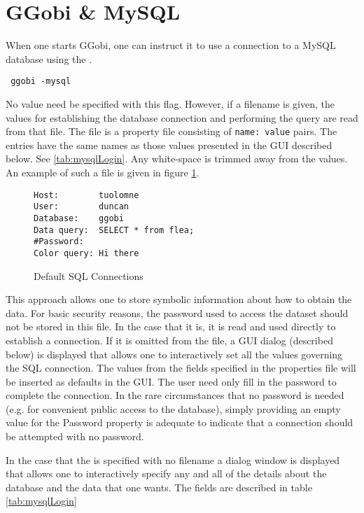 \documentclass{article}
\begin{document}
\section{GGobi \& MySQL}
When one starts GGobi, one can instruct it
to use a connection to a MySQL database
using the .
\begin{verbatim}
 ggobi -mysql
\end{verbatim}
No value need be specified with this flag.  However, if a filename is given,
the values for establishing the database connection and performing the
query are read from that file.  The file is a property file consisting
of \texttt{name: value} pairs.  The entries have the same names as
those values presented in the GUI described below.  See
\ref{tab:mysqlLogin}.  Any white-space is trimmed away from the
values. An example of such a file is given
in figure \ref{fig:mysqlInputs}.
\begin{figure}[htbp]
  \begin{center}
    \leavevmode
\begin{verbatim}
Host:        tuolomne
User:        duncan
Database:    ggobi
Data query:  SELECT * from flea;
#Password: 
Color query: Hi there
\end{verbatim}    
    \caption{Default SQL Connections}
    \label{fig:mysqlInputs}
  \end{center}
\end{figure}



This approach allows one to store symbolic information about how to
obtain the data.  For basic security reasons, the password used to
access the dataset should not be stored in this file.  In the case
that it is, it is read and used directly to establish a connection.
If it is omitted from the file, a GUI dialog (described below) is
displayed that allows one to interactively set all the values
governing the SQL connection. The values from the fields specified in
the properties file will be inserted as defaults in the GUI.  The user
need only fill in the password to complete the connection.  In the
rare circumstances that no password is needed (e.g. for convenient
public access to the database), simply providing an empty value for
the Password property is adequate to indicate that a connection should
be attempted with no password.



In the case that the  is specified with no filename a
dialog window is displayed that allows one to interactively specify
any and all of the details about the database and the data that one
wants.  The fields are described in table \ref{tab:mysqlLogin}
\end{document}
